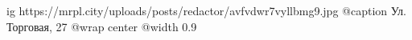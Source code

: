  
 
 
 
 

\ifcmt
  ig https://mrpl.city/uploads/posts/redactor/avfvdwr7vyllbmg9.jpg
	@caption Ул. Торговая, 27
  @wrap center
  @width 0.9
\fi
